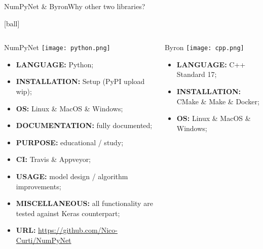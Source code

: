 \documentclass[10pt, technote, oribibl, unicode]{beamer}
\begin{document}
\begin{frame}{NumPyNet \& Byron}{Why other two libraries?}



  [ball]

  \begin{columns}

    \begin{column}{0.5\textwidth}
      \begin{block}{NumPyNet \hfill\texttt{[image: python.png]}}
        \begin{itemize}
          \item \textbf{LANGUAGE:} \textsf{Python};
          \item \textbf{INSTALLATION:} \textsf{Setup} (\textsf{PyPI} upload wip);
          \item \textbf{OS:} Linux \& MacOS \& Windows;
          \item \textbf{DOCUMENTATION:} fully documented;
          \item \textbf{PURPOSE:} educational / study;
          \item \textbf{CI:} Travis \& Appveyor;
          \item \textbf{USAGE:} model design / algorithm improvements;
          \item \textbf{MISCELLANEOUS:} all functionality are tested against \textsf{Keras} counterpart;
          \item \textbf{URL:} \url{https://github.com/Nico-Curti/NumPyNet}
        \end{itemize}
      \end{block}
    \end{column}
    \begin{column}{0.5\textwidth}
      \begin{alertblock}{Byron \hfill\texttt{[image: cpp.png]}}
        \begin{itemize}
          \item \textbf{LANGUAGE:} \textsf{C++} Standard 17;
          \item \textbf{INSTALLATION:} \textsf{CMake} \& \textsf{Make} \& \textsf{Docker};
          \item \textbf{OS:} Linux \& MacOS \& Windows;

\end{itemize}
\end{alertblock}
\end{column}
\end{columns}
\end{frame}
\end{document}
